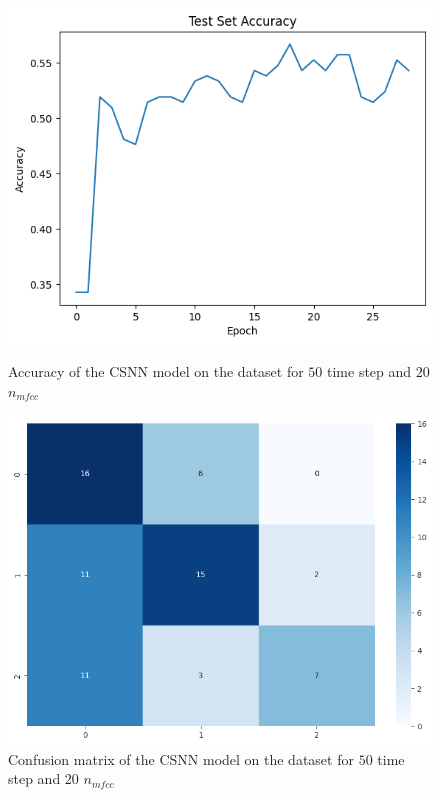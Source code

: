 \documentclass[11pt]{article}
\begin{document}
\begin{figure}[H]
  \begin{minipage}{0.5\textwidth}
    \centering
    \includegraphics[width=\textwidth]{image/csnn_1_accuracy.png}
    \caption{Accuracy of the CSNN model on the dataset for $50$ time step and $20$ $n_{mfcc}$}
  \end{minipage}
  \hspace{0.5cm}
  \begin{minipage}{0.5\textwidth}
    \centering
    \includegraphics[width=\textwidth]{image/conf_mat_csnn1.png}
    \caption{Confusion matrix of the CSNN model on the dataset for $50$ time step and $20$ $n_{mfcc}$}
  \end{minipage}
\end{figure}
\end{document}
